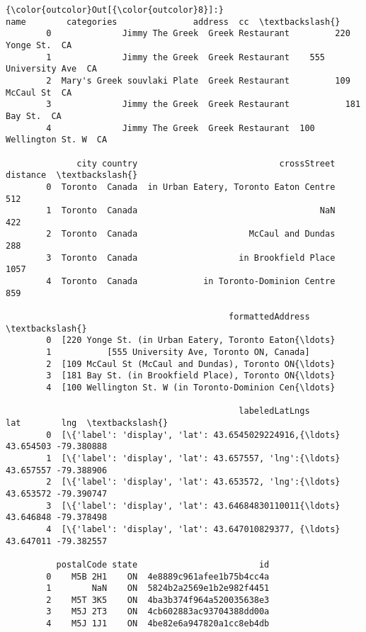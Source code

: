 \documentclass[11pt]{article}
\begin{document}
\begin{Verbatim}[commandchars=\\\{\}]
{\color{outcolor}Out[{\color{outcolor}8}]:}                           name        categories               address  cc  \textbackslash{}
        0              Jimmy The Greek  Greek Restaurant         220 Yonge St.  CA   
        1              Jimmy the Greek  Greek Restaurant    555 University Ave  CA   
        2  Mary's Greek souvlaki Plate  Greek Restaurant         109 McCaul St  CA   
        3              Jimmy the Greek  Greek Restaurant           181 Bay St.  CA   
        4              Jimmy The Greek  Greek Restaurant  100 Wellington St. W  CA   
        
              city country                            crossStreet  distance  \textbackslash{}
        0  Toronto  Canada  in Urban Eatery, Toronto Eaton Centre       512   
        1  Toronto  Canada                                    NaN       422   
        2  Toronto  Canada                      McCaul and Dundas       288   
        3  Toronto  Canada                    in Brookfield Place      1057   
        4  Toronto  Canada             in Toronto-Dominion Centre       859   
        
                                            formattedAddress  \textbackslash{}
        0  [220 Yonge St. (in Urban Eatery, Toronto Eaton{\ldots}   
        1           [555 University Ave, Toronto ON, Canada]   
        2  [109 McCaul St (McCaul and Dundas), Toronto ON{\ldots}   
        3  [181 Bay St. (in Brookfield Place), Toronto ON{\ldots}   
        4  [100 Wellington St. W (in Toronto-Dominion Cen{\ldots}   
        
                                              labeledLatLngs        lat        lng  \textbackslash{}
        0  [\{'label': 'display', 'lat': 43.6545029224916,{\ldots}  43.654503 -79.380888   
        1  [\{'label': 'display', 'lat': 43.657557, 'lng':{\ldots}  43.657557 -79.388906   
        2  [\{'label': 'display', 'lat': 43.653572, 'lng':{\ldots}  43.653572 -79.390747   
        3  [\{'label': 'display', 'lat': 43.64684830110011{\ldots}  43.646848 -79.378498   
        4  [\{'label': 'display', 'lat': 43.647010829377, {\ldots}  43.647011 -79.382557   
        
          postalCode state                        id  
        0    M5B 2H1    ON  4e8889c961afee1b75b4cc4a  
        1        NaN    ON  5824b2a2569e1b2e982f4451  
        2    M5T 3K5    ON  4ba3b374f964a520035638e3  
        3    M5J 2T3    ON  4cb602883ac93704388dd00a  
        4    M5J 1J1    ON  4be82e6a947820a1cc8eb4db  
\end{Verbatim}
            
\end{document}
